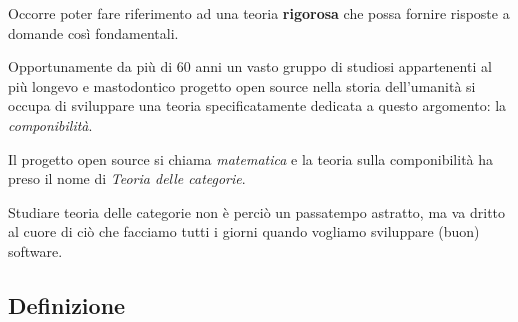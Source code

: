 \documentclass[12pt]{article}
\theoremstyle{definition}
\begin{document}
Occorre poter fare riferimento ad una teoria \textbf{rigorosa} che possa fornire risposte a domande così fondamentali.

Opportunamente da più di 60 anni un vasto gruppo di studiosi appartenenti al più longevo e mastodontico progetto open source nella storia
dell'umanità si occupa di sviluppare una teoria specificatamente dedicata a questo argomento: la \emph{componibilità}.

Il progetto open source si chiama \emph{matematica} e la teoria sulla componibilità ha preso il nome di \emph{Teoria delle categorie}.

Studiare teoria delle categorie non è perciò un passatempo astratto, ma va dritto al cuore di ciò che facciamo tutti i giorni quando vogliamo
sviluppare (buon) software.

\subsection{Definizione}
\end{document}
